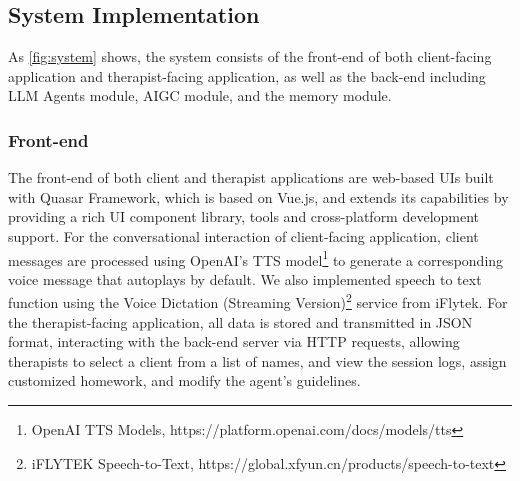 





\subsection{\name{} System Implementation}
As \autoref{fig:system} shows, the \name{} system consists of the front-end of both client-facing application and therapist-facing application, as well as the back-end including LLM Agents module, AIGC module, and the memory module.





\subsubsection{Front-end}

The front-end of both client and therapist applications are web-based UIs built with Quasar Framework, which is based on Vue.js, and extends its capabilities by providing a rich UI component library, tools and cross-platform development support. %
For the conversational interaction of client-facing application, client messages are processed using OpenAI's TTS model\footnote{OpenAI TTS Models, https://platform.openai.com/docs/models/tts} to generate a corresponding voice message that autoplays by default. We also implemented speech to text function using the Voice Dictation (Streaming Version)\footnote{iFLYTEK Speech-to-Text, https://global.xfyun.cn/products/speech-to-text} service from iFlytek. For the therapist-facing application, all data is stored and transmitted in JSON format, interacting with the back-end server via HTTP requests, allowing therapists to select a client from a list of names, and view the session logs, assign customized homework, and modify the agent's guidelines. 

